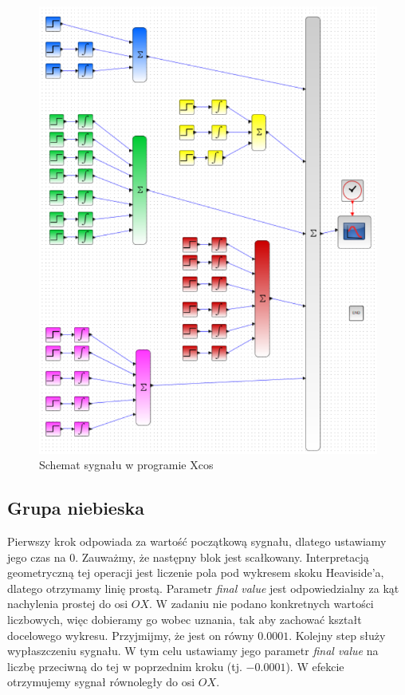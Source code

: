 \documentclass[12pt]{mwart}
\begin{document}
	\begin{figure}[H]
		\begin{center}
			\includegraphics[scale=1]{schemat.png}
			\caption{Schemat sygnału w programie Xcos}
		\end{center}
	\end{figure}
	
	
	\subsection{Grupa niebieska}
	\noindent Pierwszy krok odpowiada za wartość początkową sygnału, dlatego ustawiamy jego czas na $0$. Zauważmy, że następny blok jest scałkowany. Interpretacją geometryczną tej operacji jest liczenie pola pod wykresem skoku Heaviside'a, dlatego otrzymamy linię prostą. Parametr \textit{final value} jest odpowiedzialny za kąt nachylenia prostej do osi $OX$. W zadaniu nie podano konkretnych wartości liczbowych, więc dobieramy go wobec uznania, tak aby zachować kształt docelowego wykresu. Przyjmijmy, że jest on równy $0.0001$. Kolejny step służy wypłaszczeniu sygnału. W tym celu ustawiamy jego parametr \textit{final value} na liczbę przeciwną do tej w poprzednim kroku (tj. $-0.0001$). W efekcie otrzymujemy sygnał równoległy do osi $OX$.
	
\end{document}
